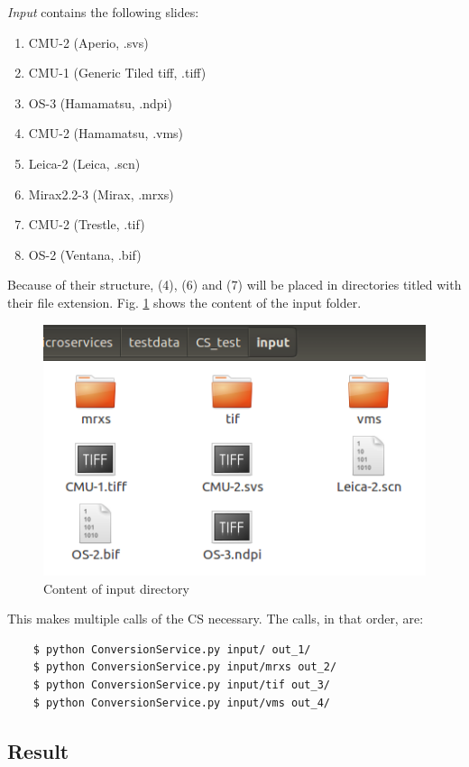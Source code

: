 \emph{Input} contains the following slides:

\begin{enumerate}[(1)]
	\item CMU-2 (Aperio, .svs)
	\item CMU-1 (Generic Tiled tiff, .tiff)
	\item OS-3 (Hamamatsu, .ndpi)
	\item CMU-2 (Hamamatsu, .vms)
	\item Leica-2 (Leica, .scn)
	\item Mirax2.2-3 (Mirax, .mrxs)
	\item CMU-2 (Trestle, .tif)
	\item OS-2 (Ventana, .bif)
\end{enumerate}

Because of their structure, (4), (6) and (7) will be placed in directories titled with their file extension. Fig. \ref{fig3_content} shows the content of the input folder.

\begin{figure}[H]
	\begin{center}
		\includegraphics[scale=0.5]{img/inputDir.png}
		\caption{Content of input directory}
		\label{fig3_content}
	\end{center}
\end{figure}

This makes multiple calls of the CS necessary. The calls, in that order, are:

\begin{lstlisting}
	$ python ConversionService.py input/ out_1/
	$ python ConversionService.py input/mrxs out_2/
	$ python ConversionService.py input/tif out_3/
	$ python ConversionService.py input/vms out_4/
\end{lstlisting}


\subsection{Result}

